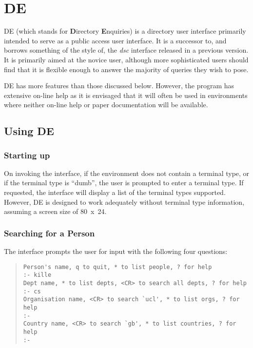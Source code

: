 \chapter{DE}
\label{DUA:de}

DE (which stands for {\bf D}irectory {\bf E}nquiries) is a directory user
interface primarily intended to serve as a public access user interface.  It
is a successor to, and borrows something of the style of, the {\em dsc} 
interface released in a previous version.
It is primarily aimed at the novice user, although more sophisticated users
should find that it is flexible enough to answer the majority of queries
they wish to pose.  

DE has more features than those discussed below.  However, the program 
has extensive on-line help as it is envisaged that it will often be used in
environments where neither on-line help or paper documentation will be
available.

\section {Using DE}

\subsection {Starting up}

On invoking the  interface, if the environment 
does not contain a terminal
type, or if the terminal type is ``dumb'', the user is prompted to enter a
terminal type.  If requested, the interface will display a list of the
terminal types supported.  However, DE is designed to work adequately 
without terminal type information, assuming a screen size of 80~x~24.

\subsection {Searching for a Person}

The interface prompts the user for input with the following four questions:

\begin{quote}\footnotesize\begin{verbatim}
Person's name, q to quit, * to list people, ? for help
:- kille
Dept name, * to list depts, <CR> to search all depts, ? for help
:- cs
Organisation name, <CR> to search `ucl', * to list orgs, ? for help
:- 
Country name, <CR> to search `gb', * to list countries, ? for help
:- 
\end{verbatim}\end{quote}

